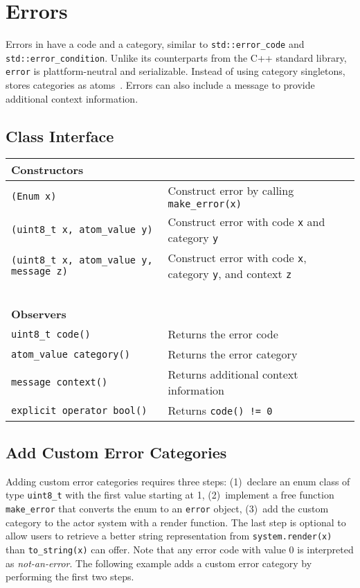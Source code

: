 \section{Errors}
\label{error}

Errors in \lib have a code and a category, similar to
\lstinline^std::error_code^ and \lstinline^std::error_condition^. Unlike its
counterparts from the C++ standard library, \lstinline^error^ is
plattform-neutral and serializable. Instead of using category singletons, \lib
stores categories as atoms~. Errors can also include a message to
provide additional context information.

\subsection{Class Interface}

\begin{center}
\begin{tabular}{ll}
  \textbf{Constructors} & ~ \\
  \hline
  \lstinline^(Enum x)^ & Construct error by calling \lstinline^make_error(x)^ \\
  \hline
  \lstinline^(uint8_t x, atom_value y)^ & Construct error with code \lstinline^x^ and category \lstinline^y^ \\
  \hline
  \lstinline^(uint8_t x, atom_value y, message z)^ & Construct error with code \lstinline^x^, category \lstinline^y^, and context \lstinline^z^ \\
  \hline
  ~ & ~ \\ \textbf{Observers} & ~ \\
  \hline
  \lstinline^uint8_t code()^ & Returns the error code \\
  \hline
  \lstinline^atom_value category()^ & Returns the error category \\
  \hline
  \lstinline^message context()^ & Returns additional context information \\
  \hline
  \lstinline^explicit operator bool()^ & Returns \lstinline^code() != 0^ \\
  \hline
\end{tabular}
\end{center}

\subsection{Add Custom Error Categories}
\label{custom-error}

Adding custom error categories requires three steps: (1)~declare an enum class
of type \lstinline^uint8_t^ with the first value starting at 1, (2)~implement a
free function \lstinline^make_error^ that converts the enum to an
\lstinline^error^ object, (3)~add the custom category to the actor system with
a render function. The last step is optional to allow users to retrieve a
better string representation from \lstinline^system.render(x)^ than
\lstinline^to_string(x)^ can offer. Note that any error code with value 0 is
interpreted as \emph{not-an-error}. The following example adds a custom error
category by performing the first two steps.


